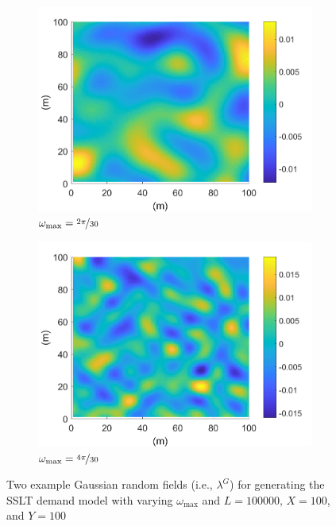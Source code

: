 \documentclass[12pt,dvipsnames]{report}
\begin{document}
\begin{figure}[ht]
	\centering
	\begin{subfigure}{.49\textwidth}
		\centering
		\includegraphics[width=1\linewidth]{lambdaG_O2pi-300_L100000_X100_Y100}
		\caption{\small $\omega_{\max}=\nicefrac{2 \pi}{30}$}
		\label{fig:lambdaG_2pi-300}
	\end{subfigure} \hfill
	\begin{subfigure}{.49\textwidth}
		\centering
		\includegraphics[width=1\linewidth]{lambdaG_O4pi-300_L100000_X100_Y100}
		\caption{\small $\omega_{\max}=\nicefrac{4 \pi}{30}$}
		\label{fig:lambdaG_4pi-300}
	\end{subfigure}
	\caption[Example Gaussian random fields for SSLT demand model generation]{\small Two example Gaussian random fields (i.e., $\lambda^G$) for generating the SSLT demand model with varying $\omega_{\max}$ and $L = 100000,\, X = 100$, and $Y = 100$}
	\label{fig:lambdaG}
\end{figure}
\end{document}
